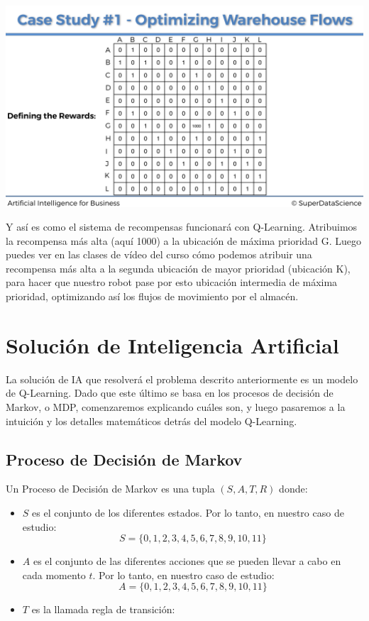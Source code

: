 \documentclass[
]{book}
\providecommand{\tightlist}{%
  \setlength{\itemsep}{0pt}\setlength{\parskip}{0pt}}
\begin{document}
\includegraphics{Images/Rewards_Matrix_5.png}

Y así es como el sistema de recompensas funcionará con Q-Learning. Atribuimos la recompensa más alta (aquí 1000) a la ubicación de máxima prioridad G. Luego puedes ver en las clases de vídeo del curso cómo podemos atribuir una recompensa más alta a la segunda ubicación de mayor prioridad (ubicación K), para hacer que nuestro robot pase por esto ubicación intermedia de máxima prioridad, optimizando así los flujos de movimiento por el almacén.

\hypertarget{soluciuxf3n-de-inteligencia-artificial}{%
\section{Solución de Inteligencia Artificial}\label{soluciuxf3n-de-inteligencia-artificial}}

La solución de IA que resolverá el problema descrito anteriormente es un modelo de Q-Learning. Dado que este último se basa en los procesos de decisión de Markov, o MDP, comenzaremos explicando cuáles son, y luego pasaremos a la intuición y los detalles matemáticos detrás del modelo Q-Learning.

\hypertarget{proceso-de-decisiuxf3n-de-markov}{%
\subsection{Proceso de Decisión de Markov}\label{proceso-de-decisiuxf3n-de-markov}}

Un Proceso de Decisión de Markov es una tupla \((S, A, T, R)\) donde:

\begin{itemize}
\tightlist
\item
  \(S\) es el conjunto de los diferentes estados. Por lo tanto, en nuestro caso de estudio: \[S = \{0,1,2,3,4,5,6,7,8,9,10,11\}\]
\item
  \(A\) es el conjunto de las diferentes acciones que se pueden llevar a cabo en cada momento \(t\). Por lo tanto, en nuestro caso de estudio: \[A = \{0,1,2,3,4,5,6,7,8,9,10,11\}\]
\item
  \(T\) es la llamada regla de transición:
\end{itemize}
\end{document}
